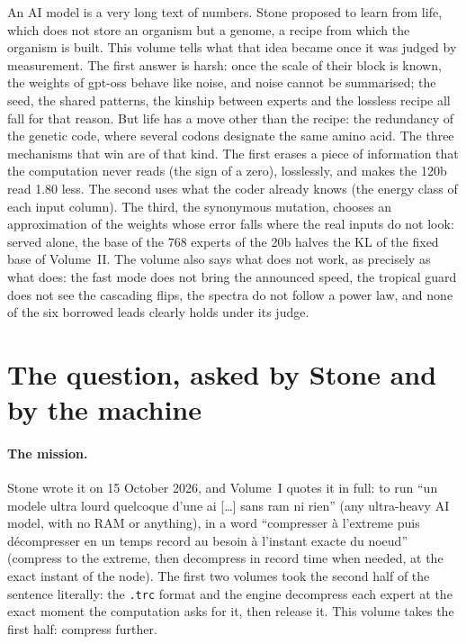 \begin{enbref}
An AI model is a very long text of numbers. Stone proposed to learn from life, which does not store an organism but a genome, a recipe from which the organism is built. This volume tells what that idea became once it was judged by measurement. The first answer is harsh: once the scale of their block is known, the weights of gpt-oss behave like noise, and noise cannot be summarised; the seed, the shared patterns, the kinship between experts and the lossless recipe all fall for that reason. But life has a move other than the recipe: the redundancy of the genetic code, where several codons designate the same amino acid. The three mechanisms that win are of that kind. The first erases a piece of information that the computation never reads (the sign of a zero), losslessly, and makes the 120b read \SI{1.80}{\Go} less. The second uses what the coder already knows (the energy class of each input column). The third, the synonymous mutation, chooses an approximation of the weights whose error falls where the real inputs do not look: served alone, the base of the 768 experts of the 20b halves the KL of the fixed base of Volume~II. The volume also says what does not work, as precisely as what does: the fast mode does not bring the announced speed, the tropical guard does not see the cascading flips, the spectra do not follow a power law, and none of the six borrowed leads clearly holds under its judge.
\end{enbref}

\section{The question, asked by Stone and by the machine}\label{t3int:sec:question}

\paragraph{The mission.} Stone wrote it on 15 October 2026, and Volume~I quotes it in full: to run ``un modele ultra lourd quelcoque d'une ai […] sans ram ni rien'' (any ultra-heavy AI model, with no RAM or anything), in a word ``compresser à l'extreme puis décompresser en un temps record au besoin à l'instant exacte du noeud'' (compress to the extreme, then decompress in record time when needed, at the exact instant of the node). The first two volumes took the second half of the sentence literally: the \texttt{.trc} format and the engine decompress each expert at the exact moment the computation asks for it, then release it. This volume takes the first half: compress further.

